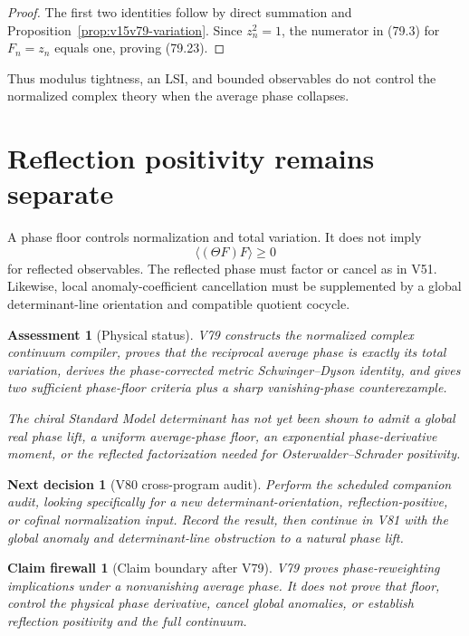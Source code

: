 \documentclass[11pt]{article}
\newtheorem{firewall}[theorem]{Claim firewall}
\newtheorem{decision}[theorem]{Next decision}
\newtheorem{assessment}[theorem]{Assessment}
\theoremstyle{remark}
\begin{document}
\begin{proof}
The first two identities follow by direct summation and
Proposition~\ref{prop:v15v79-variation}.  Since \(z_n^2=1\),
the numerator in (79.3) for \(F_n=z_n\) equals one, proving
(79.23).
\end{proof}

Thus modulus tightness, an LSI, and bounded observables do not
control the normalized complex theory when the average phase
collapses.

\section{Reflection positivity remains separate}

A phase floor controls normalization and total variation.  It does
not imply
\[
 \langle(\Theta F)F\rangle\geq0                       \tag{79.24}
\]
for reflected observables.  The reflected phase must factor or
cancel as in V51.  Likewise, local anomaly-coefficient
cancellation must be supplemented by a global determinant-line
orientation and compatible quotient cocycle.

\begin{assessment}[Physical status]
\label{ass:v15v79-status}
V79 constructs the normalized complex continuum compiler, proves
that the reciprocal average phase is exactly its total variation,
derives the phase-corrected metric Schwinger--Dyson identity, and
gives two sufficient phase-floor criteria plus a sharp
vanishing-phase counterexample.

The chiral Standard Model determinant has not yet been shown to
admit a global real phase lift, a uniform average-phase floor, an
exponential phase-derivative moment, or the reflected factorization
needed for Osterwalder--Schrader positivity.
\end{assessment}

\begin{decision}[V80 cross-program audit]
\label{dec:v15v79-next}
Perform the scheduled companion audit, looking specifically for a
new determinant-orientation, reflection-positive, or cofinal
normalization input.  Record the result, then continue in V81 with
the global anomaly and determinant-line obstruction to a natural
phase lift.
\end{decision}

\begin{firewall}[Claim boundary after V79]
\label{fire:v15v79}
V79 proves phase-reweighting implications under a nonvanishing
average phase.  It does not prove that floor, control the physical
phase derivative, cancel global anomalies, or establish reflection
positivity and the full continuum.
\end{firewall}
\end{document}
